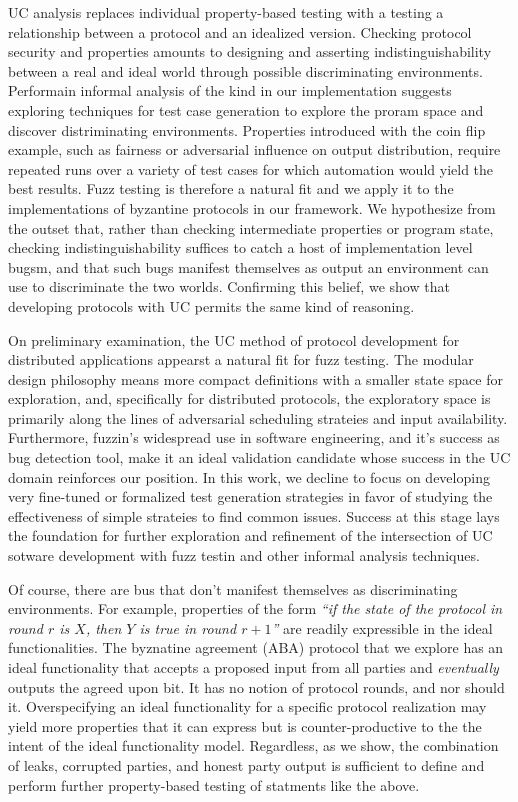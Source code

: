 UC analysis replaces individual property-based testing with a testing a relationship between a protocol and an idealized version.
Checking protocol security and properties amounts to designing and asserting indistinguishability between a real and ideal world through possible discriminating environments.
Performain informal analysis of the kind in our implementation suggests exploring techniques for test case generation to explore the proram space and discover distriminating environments.
Properties introduced with the coin flip example, such as fairness or adversarial influence on output distribution, require repeated runs over a variety of test cases for which automation would yield the best results.
Fuzz testing is therefore a natural fit and we apply it to the implementations of byzantine protocols in our framework.
We hypothesize from the outset that, rather than checking intermediate properties or program state, checking indistinguishability suffices to catch a host of implementation level bugsm, and that such bugs manifest themselves as output an environment can use to discriminate the two worlds.
Confirming this belief, we show that developing protocols with UC permits the same kind of reasoning.

On preliminary examination, the UC method of protocol development for distributed applications appearst a natural fit for fuzz testing.
The modular design philosophy means more compact definitions with a smaller state space for exploration, and, specifically for distributed protocols, the exploratory space is primarily along the lines of adversarial scheduling strateies and input availability.
Furthermore, fuzzin's widespread use in software engineering, and it's success as bug detection tool, make it an ideal validation candidate whose success in the UC domain reinforces our position.
In this work, we decline to focus on developing very fine-tuned or formalized test generation strategies in favor of studying the effectiveness of simple strateies to find common issues.
Success at this stage lays the foundation for further exploration and refinement of the intersection of UC sotware development with fuzz testin and other informal analysis techniques.

Of course, there are bus that don't manifest themselves as discriminating environments.
For example, properties of the form \emph{``if the state of the protocol in round $r$ is $X$, then $Y$ is true in round $r+1$''} are readily expressible in the ideal functionalities. 
The byznatine agreement (ABA) protocol that we explore has an ideal functionality that accepts a proposed input from all parties and \emph{eventually} outputs the agreed upon bit.
It has no notion of protocol rounds, and nor should it.
Overspecifying an ideal functionality for a specific protocol realization may yield more properties that it can express but is counter-productive to the the intent of the ideal functionality model.
Regardless, as we show, the combination of leaks, corrupted parties, and honest party output is sufficient to define and perform further property-based testing of statments like the above.

